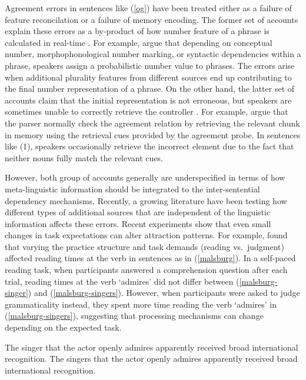 \documentclass[
  authoryear,
  preprint]{elsarticle}
\begin{document}
Agreement errors in sentences like (\ref{og}) have been treated either
as a failure of feature reconcilation or a failure of memory encoding.
The former set of accounts explain these errors as a by-product of how
number feature of a phrase is calculated in real-time
\citep{BockMiller:1991, EberhardEtAl2005, HammerlyEtAl2019}. For
example, \citet{EberhardEtAl2005} argue that depending on conceptual
number, morphophonological number marking, or syntactic dependencies
within a phrase, speakers assign a probabilistic number value to
phrases. The errors arise when additional plurality features from
different sources end up contributing to the final number representation
of a phrase. On the other hand, the latter set of accounts claim that
the initial representation is not erroneous, but speakers are sometimes
unable to correctly retrieve the controller
\citep{WagersEtAl:2009, Dillon2013a}. For example,
\citet{WagersEtAl:2009} argue that the parser normally check the
agreement relation by retrieving the relevant chunk in memory using the
retrieval cues provided by the agreement probe. In sentences like (1),
speakers occasionally retrieve the incorrect element due to the fact
that neither nouns fully match the relevant cues.

However, both group of accounts generally are underspecified in terms of
how meta-linguistic information should be integrated to the
inter-sentential dependency mechanisms. Recently, a growing literature
have been testing how different types of additional sources that are
independent of the linguistic information affects these errors. Recent
experiments show that even small changes in task expectations can alter
attraction patterns. For example, \citet{LauraMalsbug24} found that
varying the practice structure and task demands (reading vs.~judgment)
affected reading times at the verb in sentences as in (\ref{malsburg}).
In a self-paced reading task, when participants answered a comprehension
question after each trial, reading times at the verb `admires' did not
differ between (\ref{malsburg-singer}) and (\ref{malsburg-singers}).
However, when participants were asked to judge grammaticality instead,
they spent more time reading the verb `admires' in
(\ref{malsburg-singers}), suggesting that processing mechanisms can
change depending on the expected task.

\begin{exe}
\ex \label{malsburg}
\begin{xlist}
\ex \label{malsburg-singer} The singer that the actor openly admires apparently received broad international recognition.
\ex \label{malsburg-singers} The singers that the actor openly admires apparently received broad international recognition.
\end{xlist}
\end{exe}
\end{document}
